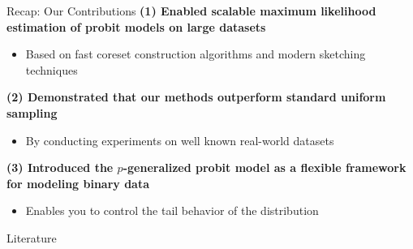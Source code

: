 \documentclass[gray]{beamer}
\begin{document}
\begin{frame}{Recap: Our Contributions} \pause
    \textbf{(1) Enabled scalable maximum likelihood estimation of
        probit models on large datasets}
    \begin{itemize}
        \item Based on fast coreset construction algorithms and modern sketching techniques
    \end{itemize}

    \pause

    \vspace{\fill}

    \textbf{(2) Demonstrated that our methods outperform standard
        uniform sampling}
    \begin{itemize}
        \item By conducting experiments on well known real-world datasets
    \end{itemize}

    \pause

    \vspace{\fill}

    \textbf{(3) Introduced the $p$-generalized probit model as a
        flexible framework for modeling binary data}
    \begin{itemize}
        \item Enables you to control the tail behavior of the distribution
    \end{itemize}
\end{frame}


\begin{frame}{Literature}
    
    
\end{frame}
\end{document}

